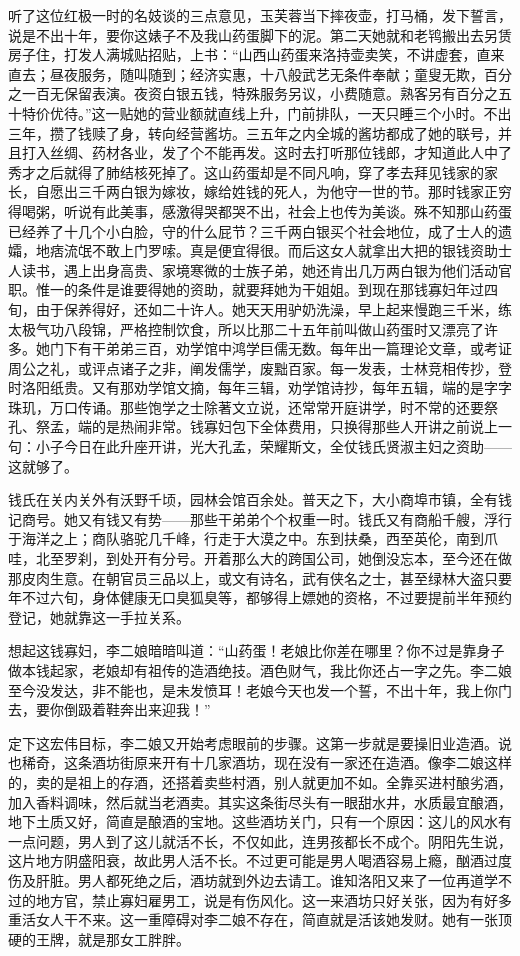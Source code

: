 听了这位红极一时的名妓谈的三点意见，玉芙蓉当下摔夜壶，打马桶，发下誓言，说是不出十年，要你这婊子不及我山药蛋脚下的泥。第二天她就和老鸨搬出去另赁房子住，打发人满城贴招贴，上书：“山西山药蛋来洛持壶卖笑，不讲虚套，直来直去；昼夜服务，随叫随到；经济实惠，十八般武艺无条件奉献；童叟无欺，百分之一百无保留表演。夜资白银五钱，特殊服务另议，小费随意。熟客另有百分之五十特价优待。”这一贴她的营业额就直线上升，门前排队，一天只睡三个小时。不出三年，攒了钱赎了身，转向经营酱坊。三五年之内全城的酱坊都成了她的联号，并且打入丝绸、药材各业，发了个不能再发。这时去打听那位钱郎，才知道此人中了秀才之后就得了肺结核死掉了。这山药蛋却是不同凡响，穿了孝去拜见钱家的家长，自愿出三千两白银为嫁妆，嫁给姓钱的死人，为他守一世的节。那时钱家正穷得喝粥，听说有此美事，感激得哭都哭不出，社会上也传为美谈。殊不知那山药蛋已经养了十几个小白脸，守的什么屁节？三千两白银买个社会地位，成了士人的遗孀，地痞流氓不敢上门罗嗦。真是便宜得很。而后这女人就拿出大把的银钱资助士人读书，遇上出身高贵、家境寒微的士族子弟，她还肯出几万两白银为他们活动官职。惟一的条件是谁要得她的资助，就要拜她为干姐姐。到现在那钱寡妇年过四旬，由于保养得好，还如二十许人。她天天用驴奶洗澡，早上起来慢跑三千米，练太极气功八段锦，严格控制饮食，所以比那二十五年前叫做山药蛋时又漂亮了许多。她门下有干弟弟三百，劝学馆中鸿学巨儒无数。每年出一篇理论文章，或考证周公之礼，或评点诸子之非，阐发儒学，废黜百家。每一发表，士林竞相传抄，登时洛阳纸贵。又有那劝学馆文摘，每年三辑，劝学馆诗抄，每年五辑，端的是字字珠玑，万口传诵。那些饱学之士除著文立说，还常常开庭讲学，时不常的还要祭孔、祭孟，端的是热闹非常。钱寡妇包下全体费用，只换得那些人开讲之前说上一句：小子今日在此升座开讲，光大孔孟，荣耀斯文，全仗钱氏贤淑主妇之资助——这就够了。

钱氏在关内关外有沃野千顷，园林会馆百余处。普天之下，大小商埠市镇，全有钱记商号。她又有钱又有势——那些干弟弟个个权重一时。钱氏又有商船千艘，浮行于海洋之上；商队骆驼几千峰，行走于大漠之中。东到扶桑，西至英伦，南到爪哇，北至罗刹，到处开有分号。开着那么大的跨国公司，她倒没忘本，至今还在做那皮肉生意。在朝官员三品以上，或文有诗名，武有侠名之士，甚至绿林大盗只要年不过六旬，身体健康无口臭狐臭等，都够得上嫖她的资格，不过要提前半年预约登记，她就靠这一手拉关系。

想起这钱寡妇，李二娘暗暗叫道：“山药蛋！老娘比你差在哪里？你不过是靠身子做本钱起家，老娘却有祖传的造酒绝技。酒色财气，我比你还占一字之先。李二娘至今没发达，非不能也，是未发愤耳！老娘今天也发一个誓，不出十年，我上你门去，要你倒趿着鞋奔出来迎我！”

定下这宏伟目标，李二娘又开始考虑眼前的步骤。这第一步就是要操旧业造酒。说也稀奇，这条酒坊街原来开有十几家酒坊，现在没有一家还在造酒。像李二娘这样的，卖的是祖上的存酒，还搭着卖些村酒，别人就更加不如。全靠买进村酿劣酒，加入香料调味，然后就当老酒卖。其实这条街尽头有一眼甜水井，水质最宜酿酒，地下土质又好，简直是酿酒的宝地。这些酒坊关门，只有一个原因：这儿的风水有一点问题，男人到了这儿就活不长，不仅如此，连男孩都长不成个。阴阳先生说，这片地方阴盛阳衰，故此男人活不长。不过更可能是男人喝酒容易上瘾，酗酒过度伤及肝脏。男人都死绝之后，酒坊就到外边去请工。谁知洛阳又来了一位再道学不过的地方官，禁止寡妇雇男工，说是有伤风化。这一来酒坊只好关张，因为有好多重活女人干不来。这一重障碍对李二娘不存在，简直就是活该她发财。她有一张顶硬的王牌，就是那女工胖胖。

